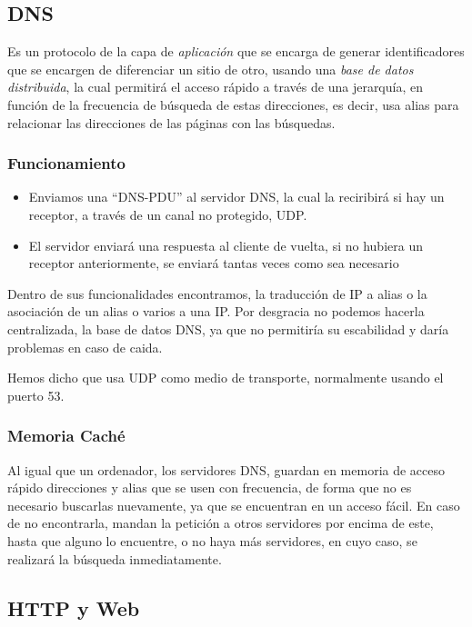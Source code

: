 \subsection{DNS}
\noindent Es un protocolo de la capa de \textit{aplicación} que se encarga de generar identificadores que se encargen de diferenciar un sitio de otro, usando una \textit{base de datos distribuida}, la cual permitirá el acceso rápido a través de una jerarquía, en función de la frecuencia de búsqueda de estas direcciones, es decir, usa alias para relacionar las direcciones de las páginas con las búsquedas.
\subsubsection{Funcionamiento}
\begin{itemize}
        \item Enviamos una ``DNS-PDU'' al servidor DNS, la cual la reciribirá si hay un receptor, a través de un canal no protegido, UDP.
        \item El servidor enviará una respuesta al cliente de vuelta, si no hubiera un receptor anteriormente, se enviará tantas veces como sea necesario
\end{itemize}
\noindent Dentro de sus funcionalidades encontramos, la traducción de IP a alias o la asociación de un alias o varios a una IP. Por desgracia no podemos hacerla centralizada, la base de datos DNS, ya que no permitiría su escabilidad y daría problemas en caso de caida.
\par \noindent Hemos dicho que usa UDP como medio de transporte, normalmente usando el puerto 53.
\subsubsection{Memoria Caché}
\noindent Al igual que un ordenador, los servidores DNS, guardan en memoria de acceso rápido direcciones y alias que se usen con frecuencia, de forma que no es necesario buscarlas nuevamente, ya que se encuentran en un acceso fácil. En caso de no encontrarla, mandan la petición a otros servidores por encima de este, hasta que alguno lo encuentre, o no haya más servidores, en cuyo caso, se realizará la búsqueda inmediatamente.
\subsection{HTTP y Web}
